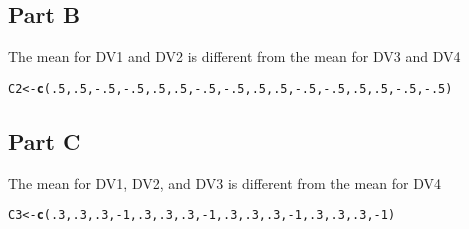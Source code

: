 \documentclass{article}\usepackage[]{graphicx}\usepackage[]{color}
\makeatletter
\newcommand{\hlnum}[1]{\textcolor[rgb]{0.686,0.059,0.569}{#1}}%
\newcommand{\hlopt}[1]{\textcolor[rgb]{0,0,0}{#1}}%
\newcommand{\hlstd}[1]{\textcolor[rgb]{0.345,0.345,0.345}{#1}}%
\newcommand{\hlkwb}[1]{\textcolor[rgb]{0.69,0.353,0.396}{#1}}%
\newcommand{\hlkwd}[1]{\textcolor[rgb]{0.737,0.353,0.396}{\textbf{#1}}}%
\newenvironment{kframe}{%
 \def\at@end@of@kframe{}%
 \ifinner\ifhmode%
  \def\at@end@of@kframe{\end{minipage}}%
  \begin{minipage}{\columnwidth}%
 \fi\fi%
 \def\FrameCommand##1{\hskip\@totalleftmargin \hskip-\fboxsep
 \colorbox{shadecolor}{##1}\hskip-\fboxsep
     \hskip-\linewidth \hskip-\@totalleftmargin \hskip\columnwidth}%
 \MakeFramed {\advance\hsize-\width
   \@totalleftmargin\z@ \linewidth\hsize
   \@setminipage}}%
 {\par\unskip\endMakeFramed%
 \at@end@of@kframe}
\newenvironment{knitrout}{}{} %
\makeatother
\begin{document}
\subsection{Part B}
The mean for DV1 and DV2 is different from the mean for DV3 and DV4 
\begin{knitrout}
\color{fgcolor}\begin{kframe}
\begin{alltt}
\hlstd{C2} \hlkwb{<-} \hlkwd{c}\hlstd{(}\hlnum{.5}\hlstd{,}\hlnum{.5}\hlstd{,}\hlopt{-}\hlnum{.5}\hlstd{,}\hlopt{-}\hlnum{.5}\hlstd{,} \hlnum{.5}\hlstd{,}\hlnum{.5}\hlstd{,}\hlopt{-}\hlnum{.5}\hlstd{,}\hlopt{-}\hlnum{.5}\hlstd{,} \hlnum{.5}\hlstd{,}\hlnum{.5}\hlstd{,}\hlopt{-}\hlnum{.5}\hlstd{,}\hlopt{-}\hlnum{.5}\hlstd{,} \hlnum{.5}\hlstd{,}\hlnum{.5}\hlstd{,}\hlopt{-}\hlnum{.5}\hlstd{,}\hlopt{-}\hlnum{.5}\hlstd{)}
\end{alltt}
\end{kframe}
\end{knitrout}

\subsection{Part C}
The mean for DV1, DV2, and DV3 is different from the mean for DV4
\begin{knitrout}
\color{fgcolor}\begin{kframe}
\begin{alltt}
\hlstd{C3} \hlkwb{<-} \hlkwd{c}\hlstd{(}\hlnum{.3}\hlstd{,}\hlnum{.3}\hlstd{,}\hlnum{.3}\hlstd{,}\hlopt{-}\hlnum{1}\hlstd{,} \hlnum{.3}\hlstd{,}\hlnum{.3}\hlstd{,}\hlnum{.3}\hlstd{,}\hlopt{-}\hlnum{1}\hlstd{,} \hlnum{.3}\hlstd{,}\hlnum{.3}\hlstd{,}\hlnum{.3}\hlstd{,}\hlopt{-}\hlnum{1}\hlstd{,} \hlnum{.3}\hlstd{,}\hlnum{.3}\hlstd{,}\hlnum{.3}\hlstd{,}\hlopt{-}\hlnum{1}\hlstd{)}
\end{alltt}
\end{kframe}
\end{knitrout}
\end{document}
